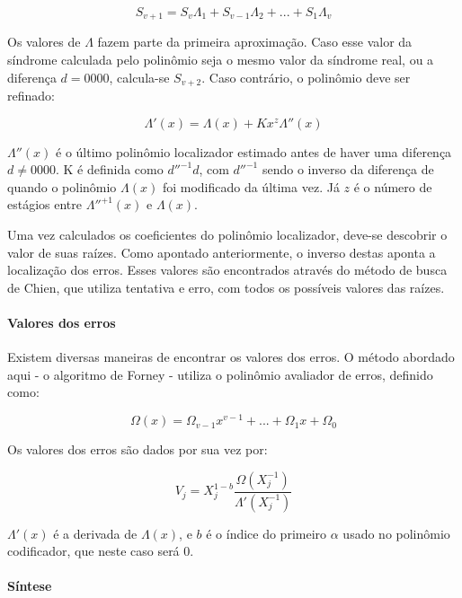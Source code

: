 	\begin{equation}
	S_{v + 1} = S_{v}\Lambda_{1} + S_{v-1}\Lambda_{2} + ... + S_{1}\Lambda_{v}
	\end{equation}

	Os valores de $\Lambda$ fazem parte da primeira aproximação. Caso esse valor da síndrome calculada pelo polinômio seja o mesmo valor da síndrome real, ou a diferença $d = 0000$, calcula-se $S_{v + 2}$. Caso contrário, o polinômio deve ser refinado:

	\begin{equation}
	\Lambda'(x) = \Lambda(x) +  Kx^{z}\Lambda''(x)
	\end{equation}

	$\Lambda''(x)$ é o último polinômio localizador estimado antes de haver uma diferença $d \neq 0000$. K é definida como $d''^{-1}d$, com $d''^{-1}$ sendo o inverso da diferença de quando o polinômio $\Lambda(x)$ foi modificado da última vez. Já $z$ é o número de estágios entre $\Lambda''^{+1}(x)$ e $\Lambda(x)$.

	Uma vez calculados os coeficientes do polinômio localizador,
	deve-se descobrir o valor de suas raízes. Como apontado anteriormente, o inverso destas aponta a localização dos erros. Esses valores são encontrados através do método de busca de Chien, que utiliza tentativa e erro, com todos os possíveis valores das raízes.

	\paragraph{Valores dos erros}

	Existem diversas maneiras de encontrar os valores dos erros. O método abordado aqui - o algoritmo de Forney - utiliza o polinômio avaliador de erros, definido como:

	\begin{equation}
	\Omega(x) = \Omega_{v-1}x^{v-1} + ... + \Omega_{1}x + \Omega_{0}
	\end{equation}

	Os valores dos erros são dados por sua vez por:

	\begin{equation}
	V_{j} = X_{j}^{1-b} \frac{\Omega(X_{j}^{-1})}{\Lambda'(X_{j}^{-1})}
	\end{equation}

	$\Lambda'(x)$ é a derivada de $\Lambda(x)$, e $b$ é o índice do primeiro $\alpha$ usado no polinômio codificador, que neste caso será 0.

	\paragraph{Síntese}

